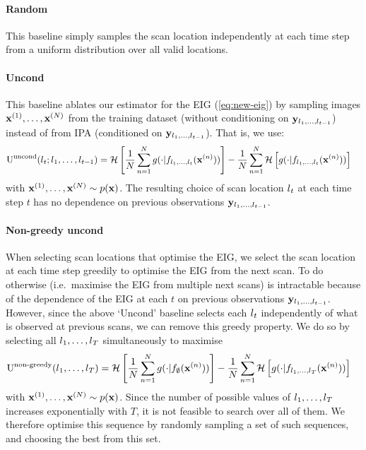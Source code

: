 \paragraph{Random}
This baseline simply samples the scan location independently at each time step
from a uniform distribution over all valid locations.

\paragraph{Uncond}
This baseline ablates our estimator for the EIG (\cref{eq:new-eig}) by sampling
images $\mathbf{x}{}^{(1)},\ldots,\mathbf{x}{}^{(N)}$ from the training dataset (without
conditioning on $\mathbf{y}{}_{l{}_1,\ldots,l{}_{t-1}}$) instead of from IPA
(conditioned on $\mathbf{y}{}_{l{}_1,\ldots,l{}_{t-1}}$). That is, we use:
\begin{align}
  \label{eq:uncond}
  \text{U}^{\text{uncond}}(l{}_t; l{}_1,&\ldots,l{}_{t-1}) = \mathcal{H} \left[ \frac{1}{N} \sum_{n=1}^N g(\cdot|f_{l{}_1,\ldots,l{}_t}(\mathbf{x}{}^{(n)})) \right] - \frac{1}{N} \sum_{n=1}^N  \mathcal{H} \left[ g(\cdot|f_{l{}_1,\ldots,l{}_t}(\mathbf{x}{}^{(n)})) \right]
\end{align}
with $\mathbf{x}{}^{(1)},\ldots,\mathbf{x}{}^{(N)} \sim p(\mathbf{x}{})$. The resulting choice of scan
location $l{}_t$ at each time step $t$ has no dependence on previous
observations $\mathbf{y}{}_{l{}_1,\ldots,l{}_{t-1}}$.

\paragraph{Non-greedy uncond}
When selecting scan locations that optimise the EIG, we select the scan location
at each time step greedily to optimise the EIG from the next scan. To do
otherwise (i.e.~maximise the EIG from multiple next scans) is intractable
because of the dependence of the EIG at each $t$ on previous observations
$\mathbf{y}{}_{l{}_1,\ldots,l{}_{t-1}}$. However, since the above `Uncond' baseline
selects each $l{}_t$ independently of what is observed at previous scans, we can
remove this greedy property. We do so by selecting all $l{}_1,\ldots,l{}_T$
simultaneously to maximise
\begin{align}
  \text{U}^{\text{non-greedy}}(l{}_1,&\ldots,l{}_T) = \mathcal{H} \left[ \frac{1}{N} \sum_{n=1}^N g(\cdot|f_{\emptyset}(\mathbf{x}{}^{(n)})) \right] - \frac{1}{N} \sum_{n=1}^N  \mathcal{H} \left[ g(\cdot|f_{l{}_1,\ldots,l{}_T}(\mathbf{x}{}^{(n)})) \right]
\end{align}
with $\mathbf{x}{}^{(1)},\ldots,\mathbf{x}{}^{(N)} \sim p(\mathbf{x}{})$. Since the number of possible
values of $l{}_1,\ldots,l{}_T$ increases exponentially with $T$, it is not feasible
to search over all of them. We therefore optimise this sequence by
randomly sampling a set of such sequences, and choosing the best from this set.


